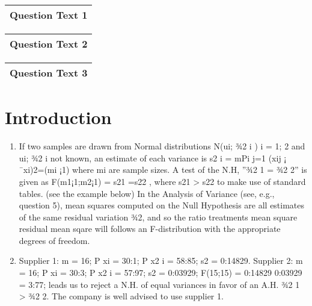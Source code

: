 \documentclass[a4paper,12pt]{article}
\begin{document}
  \begin{table}[ht!]
     \centering
     \begin{tabular}{|p{15cm}|}
     \hline        
Question Text 1
\\ \hline
      \end{tabular}
    \end{table}
    
  \begin{table}[ht!]
     \centering
     \begin{tabular}{|p{15cm}|}
     \hline  
Question Text 2   
 \\ \hline 
      \end{tabular}
    \end{table}
  \begin{table}[ht!]
     \centering
     \begin{tabular}{|p{15cm}|}
     \hline  
Question Text 3 
\\ \hline
      \end{tabular}
    \end{table}
        

\section{Introduction}
\begin{enumerate}
    \item If two samples are drawn from Normal distributions N(ui; ¾2
i ) i = 1; 2 and ui; ¾2
i not
known, an estimate of each variance is s2
i =
mPi
j=1
(xij ¡ ¯xi)2=(mi ¡1) where mi are sample
sizes. A test of the N.H, ”¾2
1 = ¾2
2” is given as F(m1¡1;m2¡1) = s21
=s22
, where s21
> s22
to
make use of standard tables. (see the example below)
In the Analysis of Variance (see, e.g., question 5), mean squares computed on the
Null Hypothesis are all estimates of the same residual variation ¾2, and so the ratio
treatments mean square
residual mean sqare will follows an F-distribution with the appropriate degrees of freedom.
\item Supplier 1: m = 16;
P
xi = 30:1;
P
x2
i = 58:85; s2 = 0:14829.
Supplier 2: m = 16;
P
xi = 30:3;
P
x2
i = 57:97; s2 = 0:03929; F(15;15) = 0:14829
0:03929 = 3:77;
leads us to reject a N.H. of equal variances in favor of an A.H. ¾2
1 > ¾2
2. The company is
well advised to use supplier 1.
\end{enumerate}
\end{document}
